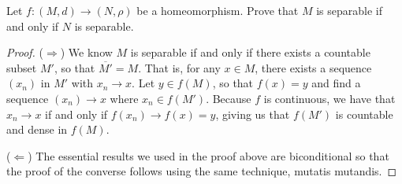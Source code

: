 \begin{exercise}{55}
Let $f:(M,d)\to(N,\rho)$ be a homeomorphism.
Prove that $M$ is separable if and only if $N$ is separable.
\end{exercise}
\begin{proof}
($\Rightarrow$) 
We know $M$ is separable if and only if there exists a countable subset $M'$, so that $\overline{M'}=M$.
That is, for any $x\in M$, there exists a sequence $(x_n)$ in $M'$ with $x_n\to x$.
Let $y\in f(M)$, so that $f(x)=y$ and find a sequence $(x_n)\to x$ where $x_n\in f(M')$.
Because $f$ is continuous, we have that $x_n\to x$ if and only if $f(x_n)\to f(x)=y$, giving us that $f(M')$ is countable and dense in $f(M)$.

($\Leftarrow$)
The essential results we used in the proof above are biconditional so that the proof of the converse follows using the same technique, mutatis mutandis.
\end{proof} 

